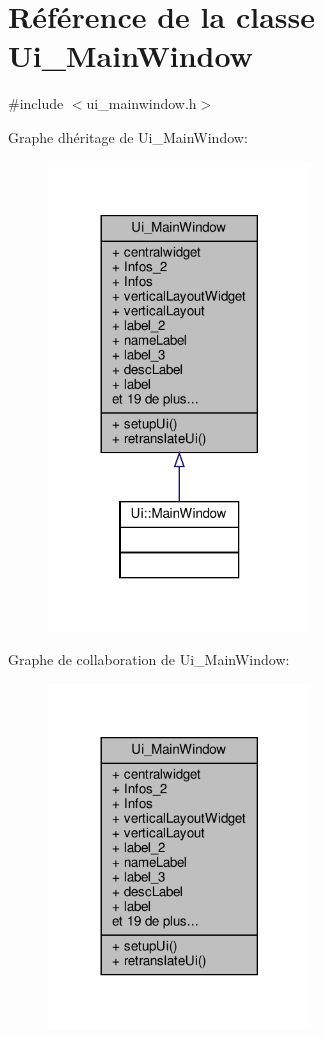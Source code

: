 \hypertarget{classUi__MainWindow}{}\section{Référence de la classe Ui\+\_\+\+Main\+Window}
\label{classUi__MainWindow}


{\ttfamily \#include $<$ui\+\_\+mainwindow.\+h$>$}



Graphe d\textquotesingle{}héritage de Ui\+\_\+\+Main\+Window\+:\nopagebreak
\begin{figure}[H]
\begin{center}
\leavevmode
\includegraphics[width=197pt]{classUi__MainWindow__inherit__graph}
\end{center}
\end{figure}


Graphe de collaboration de Ui\+\_\+\+Main\+Window\+:\nopagebreak
\begin{figure}[H]
\begin{center}
\leavevmode
\includegraphics[width=197pt]{classUi__MainWindow__coll__graph}
\end{center}
\end{figure}
